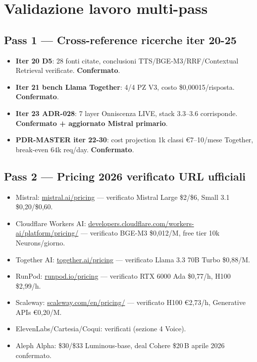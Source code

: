 \documentclass[12pt,a4paper]{article}
\begin{document}
\newpage

\section{Validazione lavoro multi-pass}

\subsection{Pass 1 --- Cross-reference ricerche iter 20-25}

\begin{itemize}[leftmargin=*]
  \item \textbf{Iter 20 D5}: 28 fonti citate, conclusioni TTS/BGE-M3/RRF/Contextual Retrieval verificate. \textbf{Confermato}.
  \item \textbf{Iter 21 bench Llama Together}: 4/4 PZ V3, costo \$0,00015/risposta. \textbf{Confermato}.
  \item \textbf{Iter 23 ADR-028}: 7 layer Onniscenza LIVE, stack 3.3--3.6 corrisponde. \textbf{Confermato + aggiornato Mistral primario}.
  \item \textbf{PDR-MASTER iter 22-30}: cost projection 1k classi €7--10/mese Together, break-even 64k req/day. \textbf{Confermato}.
\end{itemize}

\subsection{Pass 2 --- Pricing 2026 verificato URL ufficiali}

\begin{itemize}[leftmargin=*]
  \item Mistral: \href{https://mistral.ai/pricing}{mistral.ai/pricing} --- verificato Mistral Large \$2/\$6, Small 3.1 \$0,20/\$0,60.
  \item Cloudflare Workers AI: \href{https://developers.cloudflare.com/workers-ai/platform/pricing/}{developers.cloudflare.com/workers-ai/platform/pricing/} --- verificato BGE-M3 \$0,012/M, free tier 10k Neurons/giorno.
  \item Together AI: \href{https://www.together.ai/pricing}{together.ai/pricing} --- verificato Llama 3.3 70B Turbo \$0,88/M.
  \item RunPod: \href{https://www.runpod.io/pricing}{runpod.io/pricing} --- verificato RTX 6000 Ada \$0,77/h, H100 \$2,99/h.
  \item Scaleway: \href{https://www.scaleway.com/en/pricing/}{scaleway.com/en/pricing/} --- verificato H100 €2,73/h, Generative APIs €0,20/M.
  \item ElevenLabs/Cartesia/Coqui: verificati (sezione 4 Voice).
  \item Aleph Alpha: \$30/\$33 Luminous-base, deal Cohere \$20\,B aprile 2026 confermato.
\end{itemize}
\end{document}
